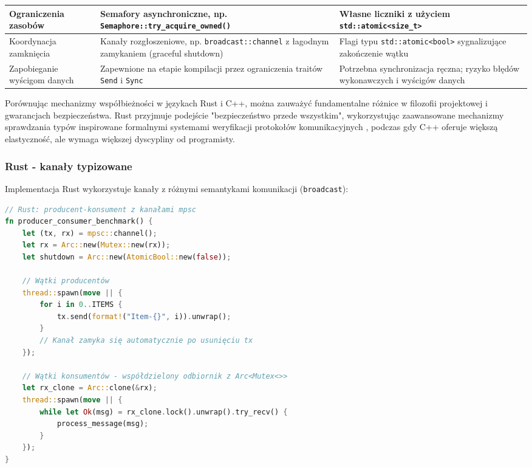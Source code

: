 \begin{table}[H]
\begin{tabularx}{\textwidth}{l>{\raggedright\arraybackslash}X>{\raggedright\arraybackslash}X}
        \midrule
        Ograniczenia zasobów &
        Semafory asynchroniczne, np. \texttt{Semaphore::try\_acquire\_owned()} &
        Własne liczniki z użyciem \texttt{std::atomic<size\_t>} \\
        \midrule
        Koordynacja zamknięcia &
        Kanały rozgłoszeniowe, np. \texttt{broadcast::channel} z łagodnym zamykaniem (graceful shutdown) &
        Flagi typu \texttt{std::atomic<bool>} sygnalizujące zakończenie wątku \\
        \midrule
        Zapobieganie wyścigom danych &
        Zapewnione na etapie kompilacji przez ograniczenia traitów \texttt{Send} i \texttt{Sync} &
        Potrzebna synchronizacja ręczna; ryzyko błędów wykonawczych i wyścigów danych \\
        \bottomrule
    \end{tabularx}
\end{table}


Porównując mechanizmy współbieżności w językach Rust i C++, można zauważyć fundamentalne różnice w filozofii projektowej i gwarancjach bezpieczeństwa. Rust przyjmuje podejście "bezpieczeństwo przede wszystkim", wykorzystując zaawansowane mechanizmy sprawdzania typów inspirowane formalnymi systemami weryfikacji protokołów komunikacyjnych \cite{10.1145/3678232.3678258}, podczas gdy C++ oferuje większą elastyczność, ale wymaga większej dyscypliny od programisty.


\subsubsection{Rust - kanały typizowane}
Implementacja Rust wykorzystuje kanały z różnymi semantykami komunikacji (\texttt{broadcast}):
\begin{lstlisting}[language=Rust, caption={Producent-Konsument w Rust z mpsc channels}, label={lst:rust_producer_consumer}]
// Rust: producent-konsument z kanałami mpsc
fn producer_consumer_benchmark() {
    let (tx, rx) = mpsc::channel();
    let rx = Arc::new(Mutex::new(rx));
    let shutdown = Arc::new(AtomicBool::new(false));
    
    // Wątki producentów
    thread::spawn(move || {
        for i in 0..ITEMS {
            tx.send(format!("Item-{}", i)).unwrap();
        }
        // Kanał zamyka się automatycznie po usunięciu tx
    });

    // Wątki konsumentów - współdzielony odbiornik z Arc<Mutex<>>
    let rx_clone = Arc::clone(&rx);
    thread::spawn(move || {
        while let Ok(msg) = rx_clone.lock().unwrap().try_recv() {
            process_message(msg);
        }
    });
}
\end{lstlisting}

